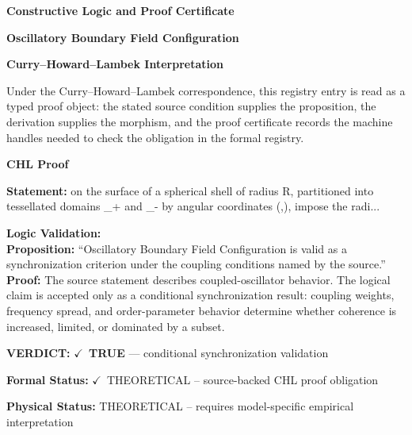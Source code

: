 \clearpage
\begingroup\tzpsupportsetup
\noindent\textbf{\fontsize{10.8pt}{12.8pt}\selectfont [ID 0320] Constructive Logic and Proof Certificate}\par
\noindent\textbf{\fontsize{10pt}{12pt}\selectfont Oscillatory Boundary Field Configuration}\par
\vspace{0.45em}
\begingroup
\footnotesize
\setlength{\parskip}{0.22em}
\setlength{\parindent}{0pt}
\noindent\textbf{Curry--Howard--Lambek Interpretation}\par
Under the Curry--Howard--Lambek correspondence, this registry entry is read as a typed proof
object: the stated source condition supplies the proposition, the derivation supplies the
morphism, and the proof certificate records the machine handles needed to check the obligation
in the formal registry.

\vspace{0.45em}
\noindent\textbf{CHL Proof}\par
\textbf{Statement:} on the surface of a spherical shell of radius R, partitioned into tessellated domains
\_+ and \_- by angular coordinates (,), impose the radi...

\textbf{Logic Validation:}\\
\textbf{Proposition:} ``Oscillatory Boundary Field Configuration is valid as a synchronization criterion under
the coupling conditions named by the source.''\\
\textbf{Proof:} The source statement describes coupled-oscillator behavior. The logical claim is
accepted only as a conditional synchronization result: coupling weights, frequency
spread, and order-parameter behavior determine whether coherence is increased, limited,
or dominated by a subset.

\textbf{VERDICT:} \ensuremath{\checkmark}\ \textbf{TRUE} --- conditional synchronization validation

\textbf{Formal Status:} \ensuremath{\checkmark}\ THEORETICAL -- source-backed CHL proof obligation

\textbf{Physical Status:} THEORETICAL -- requires model-specific empirical interpretation
\par\vspace{0.45em}
\par
\ifTZPDarkEdition
{}
\fi
\endgroup
\endgroup

